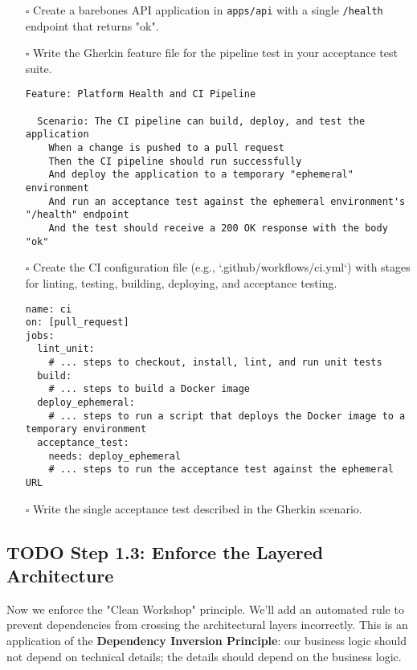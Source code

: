 \documentclass[11pt]{article}
\begin{document}
\begin{itemize}
\item[{$\square$}] Create a barebones API application in \texttt{apps/api} with a single \texttt{/health} endpoint that returns "ok".
\item[{$\square$}] Write the Gherkin feature file for the pipeline test in your acceptance test suite.
\begin{verbatim}
Feature: Platform Health and CI Pipeline

  Scenario: The CI pipeline can build, deploy, and test the application
    When a change is pushed to a pull request
    Then the CI pipeline should run successfully
    And deploy the application to a temporary "ephemeral" environment
    And run an acceptance test against the ephemeral environment's "/health" endpoint
    And the test should receive a 200 OK response with the body "ok"
\end{verbatim}
\item[{$\square$}] Create the CI configuration file (e.g., `.github/workflows/ci.yml`) with stages for linting, testing, building, deploying, and acceptance testing.
\begin{verbatim}
name: ci
on: [pull_request]
jobs:
  lint_unit:
    # ... steps to checkout, install, lint, and run unit tests
  build:
    # ... steps to build a Docker image
  deploy_ephemeral:
    # ... steps to run a script that deploys the Docker image to a temporary environment
  acceptance_test:
    needs: deploy_ephemeral
    # ... steps to run the acceptance test against the ephemeral URL
\end{verbatim}
\item[{$\square$}] Write the single acceptance test described in the Gherkin scenario.
\end{itemize}
\subsection{{\bfseries\sffamily TODO} Step 1.3: Enforce the Layered Architecture}
\label{sec:org29d7116}
Now we enforce the "Clean Workshop" principle. We'll add an automated rule to prevent dependencies from crossing the architectural layers incorrectly. This is an application of the \textbf{Dependency Inversion Principle}: our business logic should not depend on technical details; the details should depend on the business logic.
\end{document}
